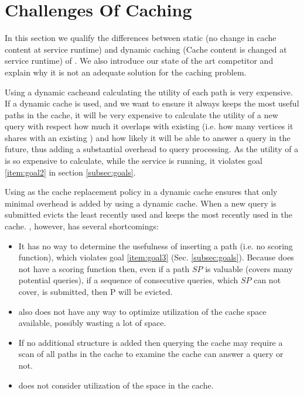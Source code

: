 \section{Challenges Of \spath Caching}\label{sec:competitors}

In this section we qualify the differences between static (no change in cache content at service runtime) and dynamic caching (Cache content is changed at service runtime) of \spathsns. We also introduce our state of the art competitor and explain why it is not an adequate solution for the \spath caching problem.


Using a dynamic cache\footnotemark and calculating the utility of each path is very expensive. If a dynamic cache is used, and we want to ensure it always keeps the most useful paths in the cache, it will be very expensive to calculate the utility of a new query with respect how much it overlaps with existing \spaths (i.e. how many vertices it shares with an existing \spathns) and how likely it will be able to answer a query in the future, thus adding a substantial overhead to query processing. As the utility of a \spath is so expensive to calculate, while the \spath service is running, it 
violates goal \ref{item:goal2} in section \ref{subsec:goals}.

Using \lru as the cache replacement policy in a dynamic cache ensures that only minimal overhead is added by using a dynamic cache. When a new query is submitted \lru evicts the least recently used \spath and keeps the most recently used \spaths in the cache.
\lru, however, has several shortcomings: 
\begin{itemize}
\item It has no way to determine the usefulness of inserting a path (i.e. no scoring function), which violates goal \ref{item:goal3} (Sec. \ref{subsec:goals}). Because \lru does not have a scoring function then, even if a path $SP$ is valuable (covers many potential queries), if a sequence of consecutive queries, which $SP$ can not cover, is submitted, then P will be evicted. 
\item \lru also does not have any way to optimize utilization of the cache space available, possibly wasting a lot of space. 
\item If no additional structure is added then querying the cache may require a scan of all paths in the cache to examine the cache can answer a query or not.
\item \lru does not consider utilization of the space in the cache.
\end{itemize}



